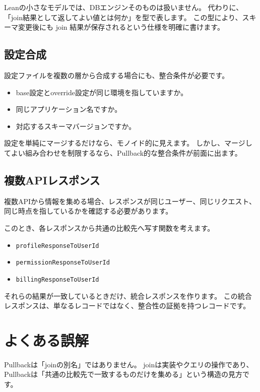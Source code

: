 Leanの小さなモデルでは、DBエンジンそのものは扱いません。
代わりに、「join結果として返してよい値とは何か」を型で表します。
この型により、スキーマ変更後にも join 結果が保存されるという仕様を明確に書けます。

\subsection{設定合成}

設定ファイルを複数の層から合成する場合にも、整合条件が必要です。

\begin{itemize}
\item base設定とoverride設定が同じ環境を指していますか。
\item 同じアプリケーション名ですか。
\item 対応するスキーマバージョンですか。
\end{itemize}

設定を単純にマージするだけなら、モノイド的に見えます。
しかし、マージしてよい組み合わせを制限するなら、Pullback的な整合条件が前面に出ます。

\subsection{複数APIレスポンス}

複数APIから情報を集める場合、レスポンスが同じユーザー、同じリクエスト、同じ時点を指しているかを確認する必要があります。

このとき、各レスポンスから共通の比較先へ写す関数を考えます。

\begin{itemize}
\item \texttt{profileResponseToUserId}
\item \texttt{permissionResponseToUserId}
\item \texttt{billingResponseToUserId}
\end{itemize}

それらの結果が一致しているときだけ、統合レスポンスを作ります。
この統合レスポンスは、単なるレコードではなく、整合性の証拠を持つレコードです。

\section{よくある誤解}

Pullbackは「joinの別名」ではありません。
joinは実装やクエリの操作であり、Pullbackは「共通の比較先で一致するものだけを集める」という構造の見方です。

